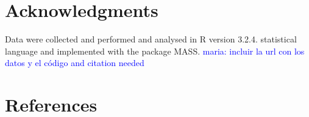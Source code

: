 \documentclass[review]{elsarticle}
\newcommand{\memo}[2]{\textcolor{#1}{#2}}
\newcommand{\maria}[1]{\memo{blue}{maria: #1\\}}
\begin{document}
\section{Acknowledgments}

Data were collected and performed and analysed in R version 3.2.4. statistical language and implemented with the package MASS.
\maria{incluir la url con los datos y el código and citation needed}





\section*{References}

%

\end{document}
